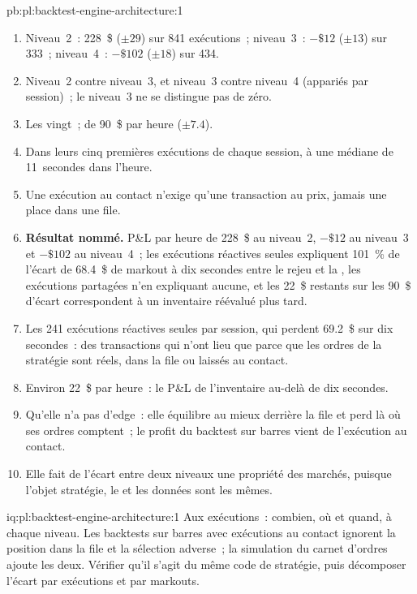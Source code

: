 \begin{solution}{pb:pl:backtest-engine-architecture:1}
\begin{enumerate}
\item Niveau~2~: 228~\$ ($\pm 29$) sur 841 exécutions~; niveau~3~: $-\$12$ ($\pm 13$) sur 333~; niveau~4~: $-\$102$ ($\pm 18$) sur 434.
\item Niveau~2 contre niveau~3, et niveau~3 contre niveau~4 (appariés par session)~; le niveau~3 ne se distingue pas de zéro.
\item Les vingt~; de 90~\$ par heure ($\pm 7.4$).
\item Dans leurs cinq premières exécutions de chaque session, à une médiane de 11~secondes dans l'heure.
\item Une exécution au contact n'exige qu'une transaction au prix, jamais une place dans une file.
\item \textbf{Résultat nommé.} P\&L par heure de 228~\$ au niveau~2, $-\$12$ au niveau~3 et $-\$102$ au niveau~4~; les exécutions réactives seules expliquent 101~\%
de l'écart de 68.4~\$ de markout à dix secondes entre le rejeu et la , les exécutions partagées n'en expliquant aucune, et les
22~\$ restants sur les 90~\$ d'écart correspondent à un inventaire réévalué plus tard.
\item Les 241 exécutions réactives seules par session, qui perdent 69.2~\$ sur dix secondes~: des transactions qui n'ont lieu que parce que les ordres de la stratégie sont
réels, dans la file ou laissés au contact.
\item Environ 22~\$ par heure~: le P\&L de l'inventaire au-delà de dix secondes.
\item Qu'elle n'a pas d'edge~: elle équilibre au mieux derrière la file et perd là où ses ordres comptent~; le profit du backtest sur barres vient de l'exécution au
contact.
\item Elle fait de l'écart entre deux niveaux une propriété des marchés, puisque l'objet stratégie, le  et les données sont les mêmes.
\end{enumerate}
\end{solution}

\begin{solution}{iq:pl:backtest-engine-architecture:1}
Aux exécutions~: combien, où et quand, à chaque niveau. Les backtests sur barres avec exécutions au contact ignorent la position dans la file et la sélection adverse~; la
simulation du carnet d'ordres ajoute les deux. Vérifier qu'il s'agit du même code de stratégie, puis décomposer l'écart par exécutions et par markouts.
\end{solution}

